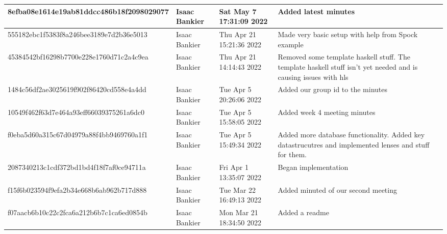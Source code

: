 \documentclass{article}
\begin{document}
\begin{xltabular}{\textwidth}{|l|l|l|X|}
  \hline
  8efba08e1614e19ab81ddcc486b18f2098029077 & Isaac Bankier & Sat May 7 17:31:09 2022 & Added latest minutes\\
  \hline
  555182ebc1f5383f8a246bee3189e7d2b36e5013 & Isaac Bankier & Thu Apr 21 15:21:36 2022 &Made very basic setup with help from Spock example\\
  \hline
  45384542bf16298b7700e228e1760d71c2a4c9ea & Isaac Bankier & Thu Apr 21 14:14:43 2022 & Removed some template haskell stuff. The template haskell stuff isn't yet needed and is causing issues with hls\\
  \hline
  1484c56df2ae3025619f902f86420cd558e4a4dd & Isaac Bankier & Tue Apr 5 20:26:06 2022 & Added our group id to the minutes\\
  \hline
  10549f462f63d7e464a93eff66039375261a6dc0 & Isaac Bankier & Tue Apr 5 15:58:05 2022 & Added week 4 meeting minutes\\
  \hline
  f0eba5d60a315c67d04979a88f4bb9469760a1f1 & Isaac Bankier & Tue Apr 5 15:49:34 2022 & Added more database functionality. Added key datastrucutres and implemented lenses and stuff for them.\\
  \hline
  2087340213c1cdf372bd1bd4f18f7af0ce94711a & Isaac Bankier & Fri Apr 1 13:35:07 2022 & Began implementation\\
  \hline
  f15f6b023594f9efa2b34e668b6ab962b717d888 & Isaac Bankier & Tue Mar 22 16:49:13 2022 & Added minuted of our second meeting\\
  \hline
  f07aacb6b10c22c2fca6a212b6b7c1ca6ed0854b & Isaac Bankier & Mon Mar 21 18:34:50 2022 & Added a readme\\
  \hline
\end{xltabular}
\end{document}
